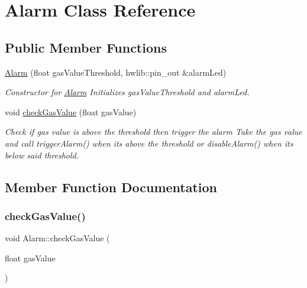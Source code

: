 \hypertarget{class_alarm}{}\section{Alarm Class Reference}
\label{class_alarm}
\subsection*{Public Member Functions}
\begin{DoxyCompactItemize}
\item 
\mbox{\label{class_alarm_af1e2f02eb5f9d8dbc6d8889792cad21b}} 
\hyperlink{class_alarm_af1e2f02eb5f9d8dbc6d8889792cad21b}{Alarm} (float gas\+Value\+Threshold, hwlib\+::pin\+\_\+out \&alarm\+Led)
\begin{DoxyCompactList}\small\item\em Constructor for \hyperlink{class_alarm}{Alarm} Initializes gas\+Value\+Threshold and alarm\+Led. \end{DoxyCompactList}\item 
void \hyperlink{class_alarm_a9e63742ac82c56fb1da7d37e8fcf812c}{check\+Gas\+Value} (float gas\+Value)
\begin{DoxyCompactList}\small\item\em Check if gas value is above the threshold then trigger the alarm Take the gas value and call trigger\+Alarm() when it\textquotesingle{}s above the threshold or disable\+Alarm() when it\textquotesingle{}s below said threshold. \end{DoxyCompactList}\end{DoxyCompactItemize}


\subsection{Member Function Documentation}
\mbox{\label{class_alarm_a9e63742ac82c56fb1da7d37e8fcf812c}} 
\subsubsection{\texorpdfstring{check\+Gas\+Value()}{checkGasValue()}}
{\footnotesize\ttfamily void Alarm\+::check\+Gas\+Value (\begin{DoxyParamCaption}\item[{float}]{gas\+Value }\end{DoxyParamCaption})}




